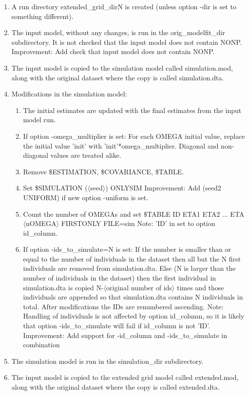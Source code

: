 \begin{enumerate}
\item A run directory extended\_grid\_dirN is created (unless option -dir is set to something different).
\item The input model, without any changes, is run in the orig\_modelfit\_dir subdirectory. It is not checked that the input model does not contain NONP. Improvement: Add check that input model does not contain NONP.
\item The input model is copied to the simulation model called simulation.mod, along with the original dataset where the copy is called simulation.dta. 
\item Modifications in the simulation model:
	\begin{enumerate}
		\item The initial estimates are updated with the final estimates from the input model run.
		\item If option -omega\_multiplier is set: For each OMEGA initial value, replace the initial value 'init' with 'init'*omega\_multiplier. Diagonal and non-diagonal values are treated alike. 
		\item Remove \$ESTIMATION, \$COVARIANCE, \$TABLE.
		\item Set \$SIMULATION ($\langle$seed$\rangle$) ONLYSIM
Improvement: Add (seed2 UNIFORM) if new option -uniform is set.
		\item Count the number of OMEGAs and set 
\$TABLE ID ETA1 ETA2 ... ETA$\langle$nOMEGA$\rangle$ FIRSTONLY FILE=sim
Note: 'ID' in set to option id\_column.
		\item If option -ids\_to\_simulate=N is set: If the number is smaller than or equal to the number of individuals in the dataset then all but the N first individuals are removed from simulation.dta. Else (N is larger than the number of individuals in the dataset) then the first individual in simulation.dta is copied N-$\langle$original number of ids$\rangle$ times and those individuals are appended so that simulation.dta contains N individuals in total. After modifications the IDs are renumbered ascending.
Note: Handling of individuals is not affected by option id\_column, so it is likely that option -ids\_to\_simulate will fail if id\_column is not 'ID'. 
Improvement: Add support for -id\_column and -ids\_to\_simulate in combination
	\end{enumerate}
\item The simulation model is run in the simulation\_dir subdirectory.
\item The input model is copied to the extended grid model called extended.mod, along with the original dataset where the copy is called extended.dta. 

\end{enumerate}
